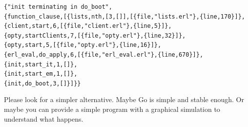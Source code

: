 \documentclass[a4paper, 11pt]{article}
\begin{document}
\begin{Verbatim}[fontsize=\scriptsize]
{"init terminating in do_boot",
{function_clause,[{lists,nth,[3,[]],[{file,"lists.erl"},{line,170}]},
{client,start,6,[{file,"client.erl"},{line,5}]},
{opty,startClients,7,[{file,"opty.erl"},{line,32}]},
{opty,start,5,[{file,"opty.erl"},{line,16}]},
{erl_eval,do_apply,6,[{file,"erl_eval.erl"},{line,670}]},
{init,start_it,1,[]},
{init,start_em,1,[]},
{init,do_boot,3,[]}]}}
\end{Verbatim}

Please look for a simpler alternative. Maybe Go is simple and stable enough. Or 
maybe you can provide a simple program with a graphical simulation to understand 
what happens.
\end{document}
